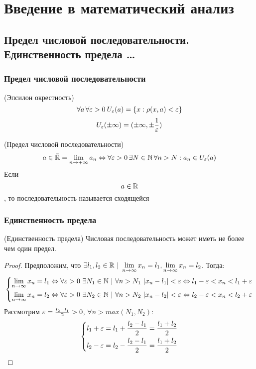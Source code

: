 \section{Введение в математический анализ}

\subsection{Предел числовой последовательности. Единственность предела \dots} %

\subsubsection{Предел числовой последовательности}
\begin{definition} (Эпсилон окрестность)
    \[\forall a \, \forall \varepsilon > 0 \: U_\varepsilon(a) = \{x : \rho (x, a) < \varepsilon \}\]
    \[\textbf{} U_\varepsilon (\pm\infty) = (\pm \infty, \pm \frac{1}{\varepsilon})\]
\end{definition}
\begin{definition}(Предел числовой последовательности)
    \[a \in \bar{\mathbb{R}} = \lim_{n \rightarrow +\infty}{a_n} \Leftrightarrow \forall \varepsilon > 0 \, \exists N \in \mathbb{N} \, \forall n > N : a_n \in U_\varepsilon(a)\]
    Если $$a\in\mathbb{R}$$, то последовательность называется сходящейся
\end{definition}


\subsubsection{Единственность предела}
\begin{theorem}(Единственность предела)
    Числовая последовательность может иметь не более чем один предел.
\end{theorem}
\begin{proof}
    Предположим, что $\exists l_1, l_2 \in \mathbb{R}\ |\ \lim\limits_{n \to \infty} x_n = l_1, \lim\limits_{n \to \infty} x_n = l_2$. Тогда:
    $$
        \left\{\begin{aligned}
        \lim\limits_{n \to \infty} x_n = l_1 \Leftrightarrow \forall \varepsilon > 0\ \exists N_1 \in \mathbb{N}\ |\ \forall n > N_1\ |x_n - l_1| < \varepsilon \Leftrightarrow l_1 - \varepsilon < x_n < l_1 + \varepsilon
        \\
        \lim\limits_{n \to \infty} x_n = l_2 \Leftrightarrow \forall \varepsilon > 0\ \exists N_2 \in \mathbb{N}\ |\ \forall n > N_2\ |x_n - l_2| < \varepsilon \Leftrightarrow l_2 - \varepsilon < x_n < l_2 + \varepsilon
        \end{aligned}\right.
    $$
    Рассмотрим $\varepsilon = \frac{l_2 - l_1}{2} > 0$, $\forall n > max(N_1, N_2)$:
    $$
        \left\{\begin{aligned}
        l_1 + \varepsilon = l_1 + \frac{l_2 - l_1}{2} = \frac{l_1 + l_2}{2}
        \\
        l_2 - \varepsilon = l_2 - \frac{l_2 - l_1}{2} = \frac{l_1 + l_2}{2}
        \end{aligned}\right.
    $$
\end{proof}

